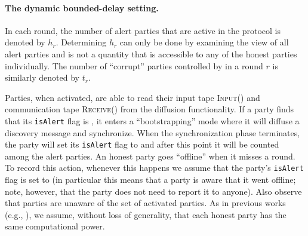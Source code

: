 \paragraph{The dynamic bounded-delay setting.}
%
In each round, the number of alert parties that are active in the protocol is denoted by $h_r$.
%
Determining $h_r$ can only be done by examining the view of all alert parties and is not a quantity that is accessible to any of the honest parties individually.
%
The number of ``corrupt'' parties controlled by \adv in a round $r$ is similarly denoted by $t_r$.

Parties, when activated, are able to read their input tape \textsc{Input()} and communication tape \textsc{Receive()} from the diffusion functionality.
%
If a party finds that its \texttt{isAlert} flag is \false, it enters a ``bootstrapping'' mode where it will diffuse a discovery message and synchronize.
%
When the synchronization phase terminates, the party will set its \texttt{isAlert} flag to \true and after this point it will be counted among the alert parties.
%
An honest party goes ``offline'' when it misses a round.
%
To record this action, whenever this happens we assume that the party's \texttt{isAlert} flag is set to \false (in particular this means that a party is aware that it went offline; note, however, that the party does not need to report it to anyone).
%
Also observe that parties are unaware of the set of activated parties.
%
As in previous works (e.g., \cite{EC:GarKiaLeo15}), we assume, without loss of generality, that each honest party has the same computational power.
